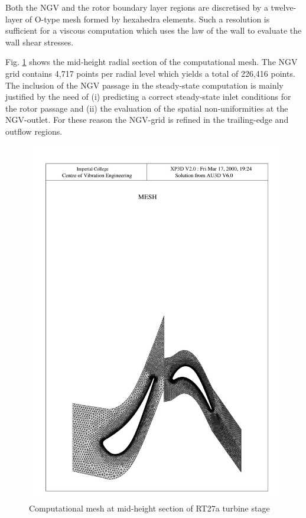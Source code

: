  Both the NGV and the rotor boundary layer regions are discretised by
 a twelve-layer of O-type mesh formed by hexahedra elements.
 Such a resolution is sufficient for a viscous computation
 which uses the law of the wall to evaluate the wall shear stresses.

 Fig. \ref{rt27_mesh3.fig} shows the mid-height radial section
 of the computational mesh.
 The NGV grid contains 4,717 points per radial level which yields a total
 of 226,416 points.
 The inclusion of the NGV passage in the steady-state computation
 is mainly justified by the need of (i) predicting a correct steady-state
 inlet conditions for the rotor passage and (ii) the evaluation of the
 spatial non-uniformities at the NGV-outlet.
 For these reason the NGV-grid is refined in the trailing-edge
 and outflow regions.
%
\begin{figure}[ht]
 \centerline{\includegraphics[width=140mm,clip=t]{CHAP_RT27/FIGURE/mesh3d_2.pdf}}
 \caption{Computational mesh at mid-height section of RT27a turbine stage}
 \label{rt27_mesh3.fig}
\end{figure}
